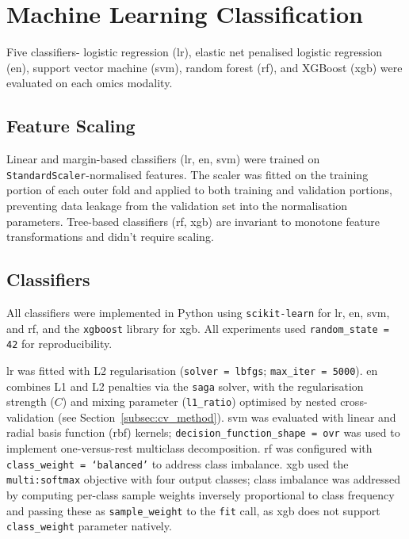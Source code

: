 \section{Machine Learning Classification}
\label{sec:ml_classification_method}

Five classifiers- logistic regression (\gls{lr}), elastic net penalised logistic regression (\gls{en}), support vector machine (\gls{svm}), random forest (\gls{rf}), and XGBoost (\gls{xgb}) were evaluated on each omics modality. 

\subsection{Feature Scaling}
 
Linear and margin-based classifiers (\gls{lr}, \gls{en}, \gls{svm}) were trained on \texttt{StandardScaler}-normalised features. The scaler was fitted on the training portion of each outer fold and applied to both training and validation portions, preventing data leakage from the validation set into the normalisation parameters. Tree-based classifiers (\gls{rf}, \gls{xgb}) are invariant to monotone feature transformations and didn't require scaling.

\subsection{Classifiers}
All classifiers were implemented in Python using \texttt{scikit-learn} \parencite{Pedregosa2011} for \gls{lr}, \gls{en}, \gls{svm}, and \gls{rf}, and the \texttt{xgboost} library \parencite{Chen2016} for \gls{xgb}. All experiments used \texttt{random\_state = 42} for reproducibility.

\gls{lr} was fitted with L2 regularisation (\texttt{solver = lbfgs}; \texttt{max\_iter = 5000}). \gls{en} combines L1 and L2 penalties via the \texttt{saga} solver, with the regularisation strength ($C$) and mixing parameter (\texttt{l1\_ratio}) optimised by nested cross-validation (see Section~\ref{subsec:cv_method}). \gls{svm} was evaluated with linear and radial basis function (\gls{rbf}) kernels; \texttt{decision\_function\_shape = ovr} was used to implement one-versus-rest multiclass decomposition. \gls{rf} was configured with \texttt{class\_weight = `balanced'} to address class imbalance. \gls{xgb} used the \texttt{multi:softmax} objective with four output classes; class imbalance was addressed by computing per-class sample weights inversely proportional to class frequency and passing these as \texttt{sample\_weight} to the \texttt{fit} call, as \gls{xgb} does not support \texttt{class\_weight} parameter natively.


